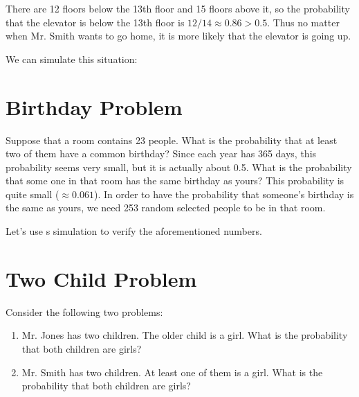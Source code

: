 There are 12 floors below the 13th floor and 15 floors above it, so the probability that the elevator is below the 13th floor is $12/14\approx0.86>0.5$. Thus no matter when Mr. Smith wants to go home, it is more likely that the elevator is going up.

We can simulate this situation:




\hypertarget{birthday-problem}{%
  \section{Birthday Problem}\label{birthday-problem}}

Suppose that a room contains 23 people. What is the probability that
at least two of them have a common birthday? Since each year has 365
days, this probability seems very small, but it is actually about
0.5. What is the probability that some one in that room has the same
birthday as yours? This probability is quite small
($\approx0.061$). In order to have the probability that someone's
birthday is the same as yours, we need 253 random selected people to
be in that room.

Let's use s simulation to verify the aforementioned numbers.




\hypertarget{Two-Child}{%
  \section{Two Child Problem}\label{Two-Child}}

Consider the following two problems:
\begin{enumerate}
\item Mr. Jones has two children. The older child is a girl. What is the
  probability that both children are girls?
\item Mr. Smith has two children. At least one of them is a girl. What is the
  probability that both children are girls?
\end{enumerate}

